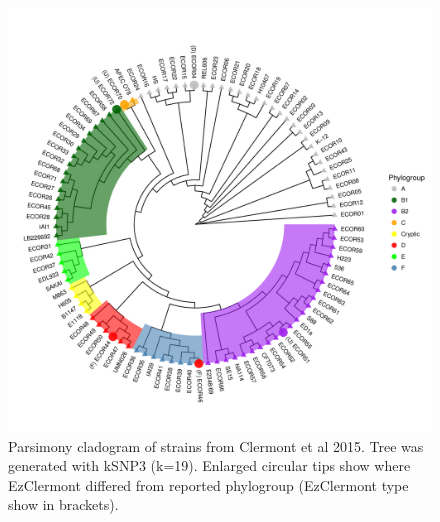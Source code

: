 \begin{figure}[h]
  \centering
  \includegraphics[width=.8\textwidth]{./analysis/cladogram.pdf}
  \caption{ Parsimony cladogram of strains from Clermont et al 2015. Tree was generated with kSNP3 (k=19). Enlarged circular tips show where EzClermont differed from reported phylogroup (EzClermont type show in brackets).}
  \label{fig:cladogram}
\end{figure}
